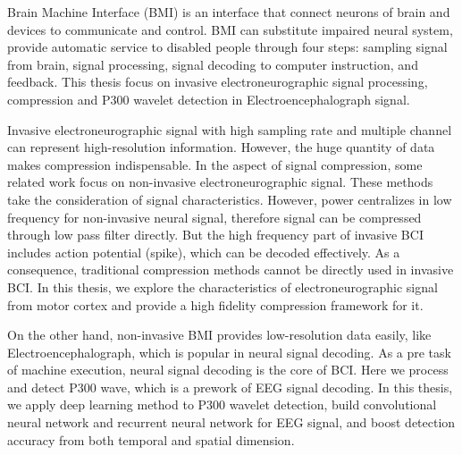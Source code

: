 \begin{englishabstract}
Brain Machine Interface (BMI) is an interface that connect neurons of brain and devices to communicate and control. BMI can substitute impaired neural system, provide automatic service to disabled people through four steps: sampling signal from brain, signal processing, signal decoding to computer instruction, and feedback. This thesis focus on invasive electroneurographic signal processing, compression and P300 wavelet detection in Electroencephalograph signal. 

Invasive electroneurographic signal with high sampling rate and multiple channel can represent high-resolution information. However, the huge quantity of data makes compression indispensable. 
In the aspect of signal compression, some related work focus on non-invasive electroneurographic signal. These methods take the consideration of signal characteristics. However, power centralizes in low frequency for non-invasive neural signal, therefore signal can be compressed through low pass filter directly. But the high frequency part of invasive BCI includes action potential (spike), which can be decoded effectively. As a consequence, traditional compression methods cannot be directly used in invasive BCI. In this thesis, we explore the characteristics of electroneurographic signal from motor cortex and provide a high fidelity compression framework for it. 

On the other hand, non-invasive BMI provides low-resolution data easily, like Electroencephalograph, which is popular in  neural signal decoding. As a pre task of machine execution, neural signal decoding is the core of BCI. Here we process and detect P300 wave, which is a prework of EEG signal decoding. In this thesis, we apply deep learning method to P300 wavelet detection, build convolutional neural network and recurrent neural network for EEG signal, and boost detection accuracy from both temporal and spatial dimension.




\end{englishabstract}
